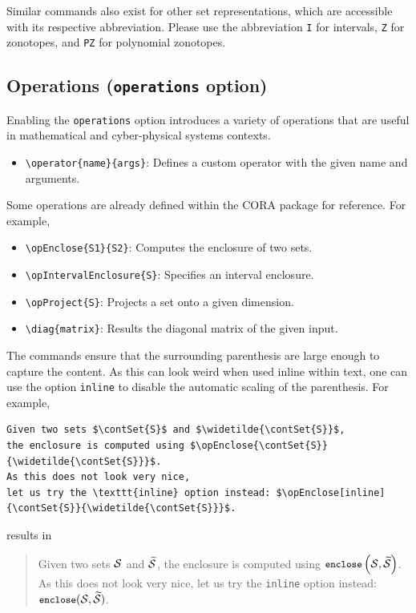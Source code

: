 \documentclass{article}
\begin{document}
Similar commands also exist for other set representations, which are accessible with its respective abbreviation.
Please use the abbreviation
\texttt{I} for intervals,
\texttt{Z} for zonotopes, and
\texttt{PZ} for polynomial zonotopes.

\subsection{Operations (\texttt{operations} option)} \label{sec:operations}
Enabling the \texttt{operations} option introduces a variety of operations that are useful in mathematical and cyber-physical systems contexts.

\begin{itemize}
  \item \verb|\operator{name}{args}|: Defines a custom operator with the given name and arguments.
\end{itemize}
Some operations are already defined within the CORA package for reference. For example,
\begin{itemize}
  \item \verb|\opEnclose{S1}{S2}|: Computes the enclosure of two sets.
  \item \verb|\opIntervalEnclosure{S}|: Specifies an interval enclosure.
  \item \verb|\opProject{S}|: Projects a set onto a given dimension.
  \item \verb|\diag{matrix}|: Results the diagonal matrix of the given input.
\end{itemize}

The commands ensure that the surrounding parenthesis are large enough to capture the content.
As this can look weird when used inline within text, one can use the option \texttt{inline} to disable the automatic scaling of the parenthesis.
For example,
\begin{verbatim}
Given two sets $\contSet{S}$ and $\widetilde{\contSet{S}}$,
the enclosure is computed using $\opEnclose{\contSet{S}}{\widetilde{\contSet{S}}}$.
As this does not look very nice,
let us try the \texttt{inline} option instead: $\opEnclose[inline]{\contSet{S}}{\widetilde{\contSet{S}}}$.
\end{verbatim}
results in
\begin{quote}
  Given two sets $\mathcal{S}$ and $\widetilde{\mathcal{S}}$,
  the enclosure is computed using $\opEnclose{\contSet{S}}{\widetilde{\contSet{S}}}$.
  As this does not look very nice,
  let us try the \texttt{inline} option instead: $\opEnclose[inline]{\contSet{S}}{\widetilde{\contSet{S}}}$.
\end{quote}
\end{document}
